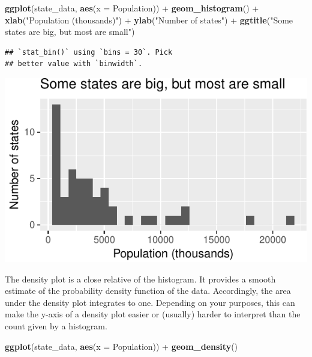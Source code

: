 \documentclass[12pt,oneside,openany]{tufte-book}
\newenvironment{Shaded}{}{}
\newcommand{\KeywordTok}[1]{\textcolor[rgb]{0.00,0.44,0.13}{\textbf{{#1}}}}
\newcommand{\DataTypeTok}[1]{\textcolor[rgb]{0.56,0.13,0.00}{{#1}}}
\newcommand{\StringTok}[1]{\textcolor[rgb]{0.25,0.44,0.63}{{#1}}}
\newcommand{\NormalTok}[1]{{#1}}
\begin{document}
\begin{Shaded}
\begin{Highlighting}[]
\KeywordTok{ggplot}\NormalTok{(state_data, }\KeywordTok{aes}\NormalTok{(}\DataTypeTok{x =} \NormalTok{Population)) +}\StringTok{ }\KeywordTok{geom_histogram}\NormalTok{() +}\StringTok{ }
\StringTok{    }\KeywordTok{xlab}\NormalTok{(}\StringTok{"Population (thousands)"}\NormalTok{) +}\StringTok{ }\KeywordTok{ylab}\NormalTok{(}\StringTok{"Number of states"}\NormalTok{) +}\StringTok{ }
\StringTok{    }\KeywordTok{ggtitle}\NormalTok{(}\StringTok{"Some states are big, but most are small"}\NormalTok{)}
\end{Highlighting}
\end{Shaded}

\begin{verbatim}
## `stat_bin()` using `bins = 30`. Pick
## better value with `binwidth`.
\end{verbatim}

\includegraphics{pdaps_files/figure-latex/axis-labeling-1}

The density plot is a close relative of the histogram. It provides a
smooth estimate of the probability density function of the data.
Accordingly, the area under the density plot integrates to one.
Depending on your purposes, this can make the y-axis of a density plot
easier or (usually) harder to interpret than the count given by a
histogram.

\begin{Shaded}
\begin{Highlighting}[]
\KeywordTok{ggplot}\NormalTok{(state_data, }\KeywordTok{aes}\NormalTok{(}\DataTypeTok{x =} \NormalTok{Population)) +}\StringTok{ }\KeywordTok{geom_density}\NormalTok{()}
\end{Highlighting}
\end{Shaded}
\end{document}

